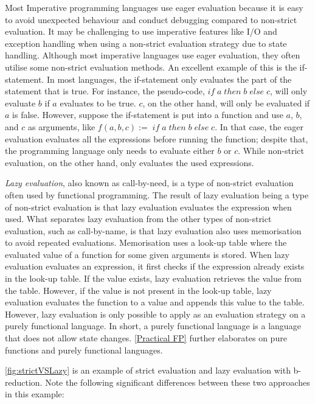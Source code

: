 \para
Most Imperative programming languages use eager evaluation because it is easy to avoid unexpected behaviour and conduct debugging compared to non-strict evaluation. It may be challenging to use imperative features like I/O and exception handling when using a non-strict evaluation strategy due to state handling. Although most imperative languages use eager evaluation, they often utilise some non-strict evaluation methods. An excellent example of this is the if-statement. In most languages, the if-statement only evaluates the part of the statement that is true. For instance, the pseudo-code, $if\; a\; then\; b\; else\; c$, will only evaluate $b$ if $a$ evaluates to be true. $c$, on the other hand, will only be evaluated if $a$ is false. However, suppose the if-statement is put into a function and use $a$, $b$, and $c$ as arguments, like $f(a, b,c):= \; if\; a\; then\; b\; else\; c$. In that case, the eager evaluation evaluates all the expressions before running the function; despite that, the programming language only needs to evaluate either $b$ or $c$. While non-strict evaluation, on the other hand, only evaluates the used expressions.

\para
\emph{Lazy evaluation}, also known as call-by-need, is a type of non-strict evaluation often used by functional programming. The result of lazy evaluation being a type of non-strict evaluation is that lazy evaluation evaluates the expression when used. What separates lazy evaluation from the other types of non-strict evaluation, such as call-by-name, is that lazy evaluation also uses memorisation to avoid repeated evaluations.  Memorisation uses a look-up table where the evaluated value of a function for some given arguments is stored.  When lazy evaluation evaluates an expression, it first checks if the expression already exists in the look-up table. If the value exists, lazy evaluation retrieves the value from the table. However, if the value is not present in the look-up table, lazy evaluation evaluates the function to a value and appends this value to the table. However, lazy evaluation is only possible to apply as an evaluation strategy on a purely functional language. In short, a purely functional language is a language that does not allow state changes. \autoref{Practical FP} further elaborates on pure functions and purely functional languages.

\para
\autoref{fig:strictVSLazy} is an example of strict evaluation and lazy evaluation with b-reduction. Note the following significant differences between these two approaches in this example:

